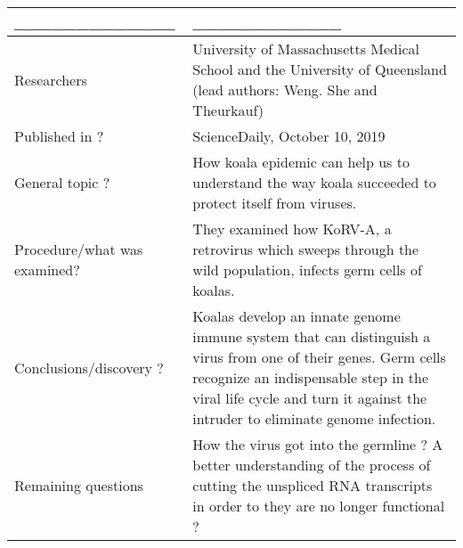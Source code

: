 \documentclass[]{article}
\begin{document}
\begin{longtable}[]{@{}ll@{}}
\toprule
\begin{minipage}[b]{0.47\columnwidth}\raggedright
\_\_\_\_\_\_\_\_\_\_\_\_\_\strut
\end{minipage} & \begin{minipage}[b]{0.47\columnwidth}\raggedright
\_\_\_\_\_\_\_\_\_\_\_\_\strut
\end{minipage}\tabularnewline
\midrule
\endhead
\begin{minipage}[t]{0.47\columnwidth}\raggedright
Researchers\strut
\end{minipage} & \begin{minipage}[t]{0.47\columnwidth}\raggedright
University of Massachusetts Medical School and the University of
Queensland (lead authors: Weng. She and Theurkauf)\strut
\end{minipage}\tabularnewline
\begin{minipage}[t]{0.47\columnwidth}\raggedright
Published in ?\strut
\end{minipage} & \begin{minipage}[t]{0.47\columnwidth}\raggedright
ScienceDaily, October 10, 2019\strut
\end{minipage}\tabularnewline
\begin{minipage}[t]{0.47\columnwidth}\raggedright
General topic ?\strut
\end{minipage} & \begin{minipage}[t]{0.47\columnwidth}\raggedright
How koala epidemic can help us to understand the way koala succeeded to
protect itself from viruses.\strut
\end{minipage}\tabularnewline
\begin{minipage}[t]{0.47\columnwidth}\raggedright
Procedure/what was examined?\strut
\end{minipage} & \begin{minipage}[t]{0.47\columnwidth}\raggedright
They examined how KoRV-A, a retrovirus which sweeps through the wild
population, infects germ cells of koalas.\strut
\end{minipage}\tabularnewline
\begin{minipage}[t]{0.47\columnwidth}\raggedright
Conclusions/discovery ?\strut
\end{minipage} & \begin{minipage}[t]{0.47\columnwidth}\raggedright
Koalas develop an innate genome immune system that can distinguish a
virus from one of their genes. Germ cells recognize an indispensable
step in the viral life cycle and turn it against the intruder to
eliminate genome infection.\strut
\end{minipage}\tabularnewline
\begin{minipage}[t]{0.47\columnwidth}\raggedright
Remaining questions\strut
\end{minipage} & \begin{minipage}[t]{0.47\columnwidth}\raggedright
How the virus got into the germline ? A better understanding of the
process of cutting the unspliced RNA transcripts in order to they are no
longer functional ?\strut
\end{minipage}\tabularnewline
\bottomrule
\end{longtable}
\end{document}
